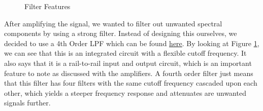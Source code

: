 \begin{figure}[H]
  \centering
  \caption{Filter Features}
  \label{img:filterspecs}
\end{figure}

After amplifying the signal, we wanted to filter out unwanted spectral components by using a strong filter. Instead of designing
this ourselves, we decided to use a 4th Order LPF which can be found \href{https://www.digikey.com/en/products/detail/analog-devices-inc/LTC1563-2IGN-PBF/962958}{here}.
By looking at Figure \ref{img:filterspecs}, we can see that this is an integrated circuit with a flexible cutoff frequency.
It also says that it is a rail-to-rail input and output circuit, which is an important feature to note as discussed with the amplifiers.
A fourth order filter just means that this filter has four filters with the same cutoff frequency cascaded upon each other, which
yields a steeper frequency response and attenuates are unwanted signals further.